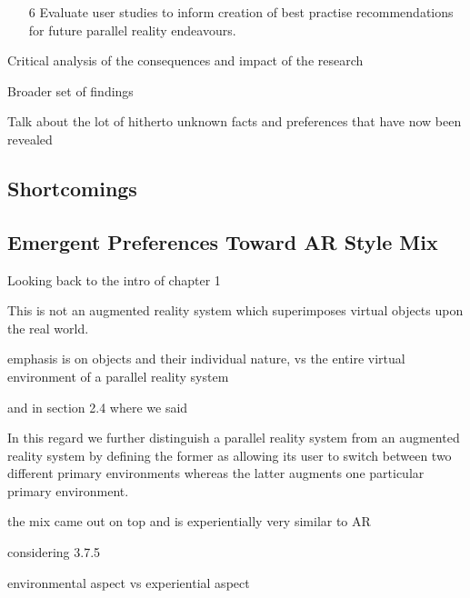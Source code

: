 \begin{enumerate}
	\item[6] Evaluate user studies to inform creation of best practise recommendations for future parallel reality endeavours.
\end{enumerate}





Critical analysis of the consequences and impact of the research

Broader set of findings

Talk about the lot of hitherto unknown facts and preferences that have now been revealed





\subsection{Shortcomings}


\subsection{Emergent Preferences Toward AR Style Mix}

Looking back to the intro of chapter 1

This is not an augmented reality system which superimposes virtual objects upon the real
world.

emphasis is on objects and their individual nature, vs the entire virtual environment of a parallel reality system




and in section 2.4 where we said

In this regard we further distinguish a parallel reality system from an augmented
reality system by defining the former as allowing its user to switch between two different primary
environments whereas the latter augments one particular primary environment.



the mix came out on top and is experientially very similar to AR

considering 3.7.5

environmental aspect vs experiential aspect

